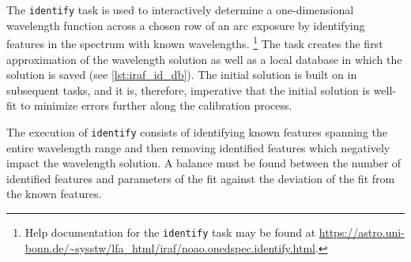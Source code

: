 The \texttt{identify} task is used to interactively determine a one-dimensional wavelength function across a chosen row of an arc exposure by identifying features in the spectrum with known wavelengths.%
\footnote{Help documentation for the \texttt{identify} task may be found at \url{https://astro.uni-bonn.de/~sysstw/lfa_html/iraf/noao.onedspec.identify.html}.}
The task creates the first approximation of the wavelength solution as well as a local database in which the solution is saved (see \autoref{lst:iraf_id_db}). The initial solution is built on in subsequent tasks, and it is, therefore, imperative that the initial solution is well-fit to minimize errors further along the calibration process.

The execution of \texttt{identify} consists of identifying known features spanning the entire wavelength range and then removing identified features which negatively impact the wavelength solution. A balance must be found between the number of identified features and parameters of the fit against the deviation of the fit from the known features.

